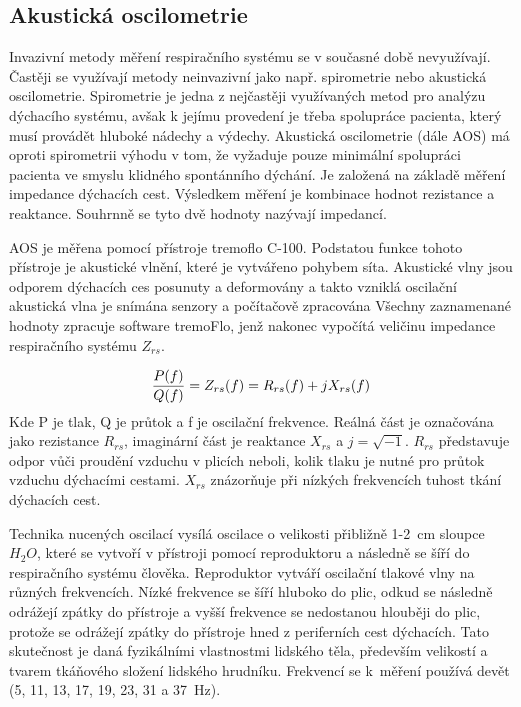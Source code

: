  \label{kap-metody}
\subsection {Akustická oscilometrie}
Invazivní metody měření respiračního systému se v současné době nevyužívají. Častěji se využívají metody neinvazivní jako např. spirometrie nebo akustická oscilometrie. Spirometrie je jedna z nejčastěji využívaných metod pro analýzu dýchacího systému, avšak k jejímu provedení je třeba spolupráce pacienta, který musí provádět hluboké nádechy a výdechy.
Akustická oscilometrie (dále AOS) má oproti spirometrii výhodu v tom, že vyžaduje pouze minimální spolupráci pacienta ve smyslu klidného spontánního dýchání. 
Je založená na základě měření impedance dýchacích cest. Výsledkem měření je kombinace hodnot rezistance a reaktance. Souhrnně se tyto dvě hodnoty nazývají impedancí. 

AOS je měřena pomocí přístroje tremoflo C-100. Podstatou funkce tohoto přístroje je akustické vlnění, které je vytvářeno pohybem síta. Akustické vlny jsou odporem dýchacích ces posunuty a deformovány a takto vzniklá oscilační akustická vlna je snímána senzory a počítačově zpracována
 Všechny zaznamenané hodnoty zpracuje software tremoFlo, jenž nakonec vypočítá veličinu impedance respiračního systému $Z_{rs}$. 

\begin{equation}
 \label{rce:1}
  {P(f) \over Q(f)} = Z_{rs}(f) = R_{rs}(f) + j X_{rs}(f) 
\end{equation}
Kde P je tlak, Q je průtok a f je oscilační frekvence. 
Reálná část je označována jako rezistance $R_{rs}$, imaginární část je reaktance $X_{rs}$ a $j = \sqrt{-1}$. 
$R_{rs}$ představuje odpor vůči proudění vzduchu v plicích neboli, kolik tlaku je nutné pro průtok vzduchu dýchacími cestami. $X_{rs}$ znázorňuje při nízkých frekvencích tuhost tkání dýchacích cest. 


Technika nucených oscilací vysílá oscilace o velikosti přibližně 1-2~cm sloupce $H_{2}O$, které se vytvoří v přístroji pomocí reproduktoru a následně se šíří do respiračního systému člověka. Reproduktor vytváří oscilační tlakové vlny na různých frekvencích. Nízké frekvence se šíří hluboko do plic, odkud se následně odrážejí zpátky do přístroje a vyšší frekvence se nedostanou hlouběji do plic, protože se  odrážejí zpátky do přístroje hned z periferních cest dýchacích. Tato skutečnost je daná fyzikálními vlastnostmi lidského těla, především velikostí a tvarem tkáňového složení lidského hrudníku. \cite{Vlcek2018} Frekvencí se k~měření používá devět (5, 11, 13, 17, 19, 23, 31 a 37~Hz). 


